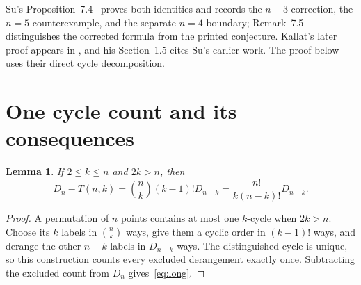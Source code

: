 \documentclass[11pt]{article}
\newtheorem{lemma}[theorem]{Lemma}
\newcommand{\Der}{D}
\begin{document}
Su's Proposition~7.4~\cite{su} proves both identities and records the
$n-3$ correction, the $n=5$ counterexample, and the separate $n=4$ boundary;
Remark~7.5 distinguishes the corrected formula from the printed conjecture.
Kallat's later proof appears in
\cite[Theorem~4.1(c)--(d), Appendix~A.11.3, footnote~3]{valuation},
and his Section~1.5 cites Su's earlier work.
The proof below uses their direct cycle decomposition.

\section{One cycle count and its consequences}

\begin{lemma}\label{lem:long}
If $2\leq k\leq n$ and $2k>n$, then
\begin{equation}\label{eq:long}
 \Der_n-T(n,k)=\binom nk(k-1)!\Der_{n-k}
             =\frac{n!}{k(n-k)!}\Der_{n-k}.
\end{equation}
\end{lemma}
\begin{proof}
A permutation of $n$ points contains at most one $k$-cycle when $2k>n$.
Choose its $k$ labels in $\binom nk$ ways, give them a cyclic order in
$(k-1)!$ ways, and derange the other $n-k$ labels in $\Der_{n-k}$ ways.
The distinguished cycle is unique, so this construction counts every excluded
derangement exactly once. Subtracting the excluded count from $\Der_n$
gives~\eqref{eq:long}.
\end{proof}
\end{document}
